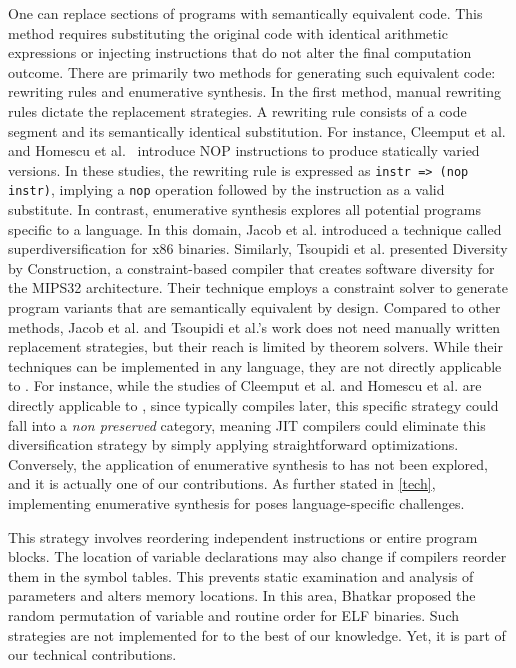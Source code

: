 One can replace sections of programs with semantically equivalent code. 
This method requires substituting the original code with identical arithmetic expressions or injecting instructions that do not alter the final computation outcome. 
There are primarily two methods for generating such equivalent code: rewriting rules and enumerative synthesis. 
In the first method, manual rewriting rules dictate the replacement strategies. 
A rewriting rule consists of a code segment and its semantically identical substitution. 
For instance, Cleemput et al. \cite{Cleemput2012} and Homescu et al.~\cite{homescu2013profile} introduce NOP instructions to produce statically varied versions. 
In these studies, the rewriting rule is expressed as \texttt{instr => (nop instr)}, implying a \texttt{nop} operation followed by the instruction as a valid substitute.
In contrast, enumerative synthesis explores all potential programs specific to a language. 
In this domain, Jacob et al. \cite{jacob2008superdiversifier} introduced a technique called superdiversification for x86 binaries. 
Similarly, Tsoupidi et al. \cite{Tsoupidi2020ConstraintBasedSD} presented Diversity by Construction, a constraint-based compiler that creates software diversity for the MIPS32 architecture.  
Their technique employs a constraint solver to generate program variants that are semantically equivalent by design.
Compared to other methods, Jacob et al. and Tsoupidi et al.'s work does not need manually written replacement strategies, but their reach is limited by theorem solvers.
While their techniques can be implemented in any language, they are not directly applicable to \Wasm.
For instance, while the studies of Cleemput et al. and Homescu et al. are directly applicable to \Wasm, since \Wasm typically compiles later, this specific strategy could fall into a \emph{non preserved} category, meaning JIT compilers could eliminate this diversification strategy by simply applying straightforward optimizations.
Conversely, the application of enumerative synthesis to \Wasm has not been explored, and it is actually one of our contributions. 
As further stated in \autoref{tech}, implementing enumerative synthesis for \Wasm poses language-specific challenges.


This strategy involves reordering independent instructions or entire program blocks.
The location of variable declarations may also change if compilers reorder them in the symbol tables. This prevents static examination and analysis of parameters and alters memory locations. In this area, Bhatkar \etal \cite{bhatkar03, bhatkar2005efficient} proposed the random permutation of variable and routine order for ELF binaries.
Such strategies are not implemented for \Wasm to the best of our knowledge.
Yet, it is part of our technical contributions.

